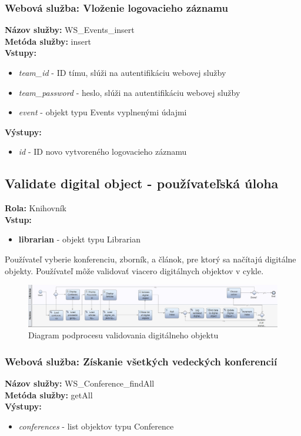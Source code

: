 \documentclass[10pt,oneside,slovak,a4paper]{article}
\begin{document}
\subsubsection{Webová služba: Vloženie logovacieho záznamu}
\textbf{Názov služby:} WS\_Events\_insert\\
\textbf{Metóda služby:} insert\\
\textbf{Vstupy:}
	\begin{itemize}
		\item \textit{team\_id} - ID tímu, slúži na autentifikáciu webovej služby
		\item \textit{team\_password} - heslo, slúži na autentifikáciu webovej služby
		\item \textit{event} - objekt typu Events vyplnenými údajmi
	\end{itemize}
\textbf{Výstupy:}
	\begin{itemize}
		\item \textit{id} - ID novo vytvoreného logovacieho záznamu
	\end{itemize}
	
\subsection{Validate digital object - používateľská úloha}
\textbf{Rola:} Knihovník\\
\textbf{Vstup:}

\begin{itemize}
\item \textbf{librarian} - objekt typu Librarian
\end{itemize}

Používateľ vyberie konferenciu, zborník, a článok, pre ktorý sa načítajú digitálne objekty. Používateľ môže validovať viacero digitálnych objektov v cykle.

\begin{figure} [H]
\centering
\includegraphics[scale=0.4]{diagrams/diagValidate.jpg} 
\caption{Diagram podprocesu validovania digitálneho objektu}
\end{figure}

\subsubsection{Webová služba: Získanie všetkých vedeckých konferencií}
\textbf{Názov služby:} WS\_Conference\_findAll\\
\textbf{Metóda služby:} getAll\\
\textbf{Výstupy:}
	\begin{itemize}
		\item \textit{conferences} - list objektov typu Conference
	\end{itemize}
	
\end{document}
